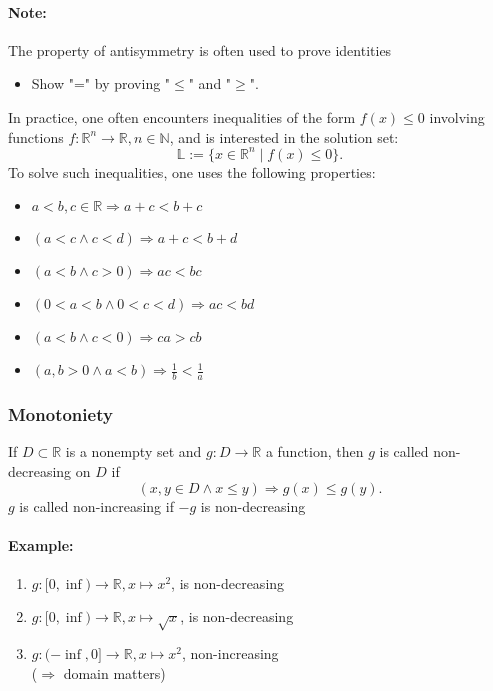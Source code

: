 \documentclass[twocolumn]{article}
\begin{document}
			\paragraph{Note:}
				The property of antisymmetry is often used to prove identities
				\begin{itemize}%
				\renewcommand{\labelitemi}{$\rightarrow$}
				\item Show "=" by proving "$\le$" and "$\ge$".  
				\end{itemize}
				In practice, one often encounters inequalities of the form $f(x)\le 0$ involving
				functions $f:\mathbb R^n\to\mathbb R ,n\in \mathbb N $, and is interested in the
				solution set:
				\[
				\mathbb L:=\{x\in\mathbb R ^n\mid f(x)\le0\}
				.\] 
				To solve such inequalities, one uses the following properties:
				\begin{itemize}
				\item $a<b,c\in\mathbb R \Rightarrow a+c<b+c$ 
				\item $(a<c\wedge c<d)\Rightarrow a+c<b+d$ 
				\item $(a<b\wedge c>0)\Rightarrow ac<bc$
				\item $(0<a<b\wedge0<c<d)\Rightarrow ac<bd$ 
				\item $(a<b\wedge c<0)\Rightarrow ca>cb$
				\item $(a,b>0\wedge a<b)\Rightarrow\frac{1}{b}<\frac{1}{a}$ 
				\end{itemize}	


		\subsubsection{Monotoniety}
			If $D\subset\mathbb R $ is a nonempty set and $g:D\to\mathbb R $ a function, then $g$ is 
			called non-decreasing on $D$ if
			\[
				(x,y\in D\wedge x\le y)\Rightarrow g(x)\le g(y)
			.\] 
			$g$ is called non-increasing if $-g$ is non-decreasing
			\paragraph{Example:}
				\begin{enumerate}
				\item $g:[0,\inf)\to\mathbb R ,x\mapsto x^2$, is non-decreasing
				\item $g:[0,\inf)\to\mathbb R ,x\mapsto\sqrt x$, is non-decreasing
				\item $g:(-\inf,0]\to\mathbb R ,x\mapsto x^2$, non-increasing \\($\Rightarrow$ 
					domain matters)  
				\end{enumerate}
\end{document}
